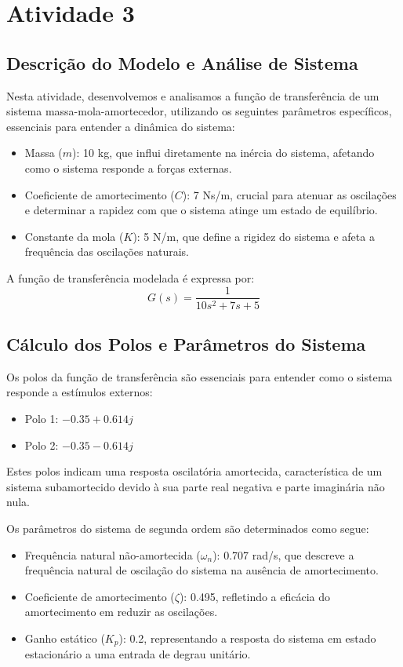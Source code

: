 \section{Atividade 3}

\subsection{Descrição do Modelo e Análise de Sistema}
Nesta atividade, desenvolvemos e analisamos a função de transferência de um sistema massa-mola-amortecedor, utilizando os seguintes parâmetros específicos, essenciais para entender a dinâmica do sistema:
\begin{itemize}
    \item Massa (\( m \)): 10 kg, que influi diretamente na inércia do sistema, afetando como o sistema responde a forças externas.
    \item Coeficiente de amortecimento (\( C \)): 7 Ns/m, crucial para atenuar as oscilações e determinar a rapidez com que o sistema atinge um estado de equilíbrio.
    \item Constante da mola (\( K \)): 5 N/m, que define a rigidez do sistema e afeta a frequência das oscilações naturais.
\end{itemize}
A função de transferência modelada é expressa por:
\[
    G(s) = \frac{1}{10s^2 + 7s + 5}
\]

\subsection{Cálculo dos Polos e Parâmetros do Sistema}
Os polos da função de transferência são essenciais para entender como o sistema responde a estímulos externos:
\begin{itemize}
    \item Polo 1: \( -0.35 + 0.614j \)
    \item Polo 2: \( -0.35 - 0.614j \)
\end{itemize}
Estes polos indicam uma resposta oscilatória amortecida, característica de um sistema subamortecido devido à sua parte real negativa e parte imaginária não nula.

Os parâmetros do sistema de segunda ordem são determinados como segue:
\begin{itemize}
    \item Frequência natural não-amortecida (\( \omega_n \)): 0.707 rad/s, que descreve a frequência natural de oscilação do sistema na ausência de amortecimento.
    \item Coeficiente de amortecimento (\( \zeta \)): 0.495, refletindo a eficácia do amortecimento em reduzir as oscilações.
    \item Ganho estático (\( K_p \)): 0.2, representando a resposta do sistema em estado estacionário a uma entrada de degrau unitário.
\end{itemize}

